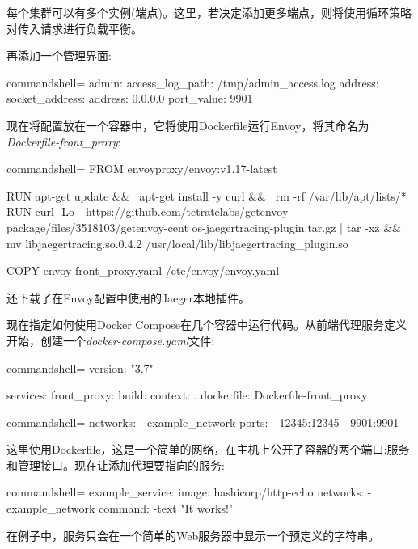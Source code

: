 每个集群可以有多个实例(端点)。这里，若决定添加更多端点，则将使用循环策略对传入请求进行负载平衡。

再添加一个管理界面:

\begin{tcblisting}{commandshell={}}
admin:
  access_log_path: /tmp/admin_access.log
  address:
   socket_address:
     address: 0.0.0.0
     port_value: 9901
\end{tcblisting}

现在将配置放在一个容器中，它将使用Dockerfile运行Envoy，将其命名为\textit{Dockerfile-front\_proxy}:

\begin{tcblisting}{commandshell={}}
FROM envoyproxy/envoy:v1.17-latest

RUN apt-get update && \
apt-get install -y curl && \
rm -rf /var/lib/apt/lists/*
RUN curl -Lo -
https://github.com/tetratelabs/getenvoy-package/files/3518103/getenvoy-cent
os-jaegertracing-plugin.tar.gz | tar -xz && mv libjaegertracing.so.0.4.2
/usr/local/lib/libjaegertracing_plugin.so

COPY envoy-front_proxy.yaml /etc/envoy/envoy.yaml

\end{tcblisting}

还下载了在Envoy配置中使用的Jaeger本地插件。

现在指定如何使用Docker Compose在几个容器中运行代码。从前端代理服务定义开始，创建一个\textit {docker-compose.yaml}文件:

\begin{tcblisting}{commandshell={}}
version: "3.7"

services:
  front_proxy:
    build:
      context: .
      dockerfile: Dockerfile-front_proxy
\end{tcblisting}
\begin{tcblisting}{commandshell={}}
    networks:
      - example_network
    ports:
      - 12345:12345
      - 9901:9901
\end{tcblisting}

这里使用Dockerfile，这是一个简单的网络，在主机上公开了容器的两个端口:服务和管理接口。现在让添加代理要指向的服务:

\begin{tcblisting}{commandshell={}}
example_service:
  image: hashicorp/http-echo
  networks:
    - example_network
  command: -text "It works!"

\end{tcblisting}

在例子中，服务只会在一个简单的Web服务器中显示一个预定义的字符串。

